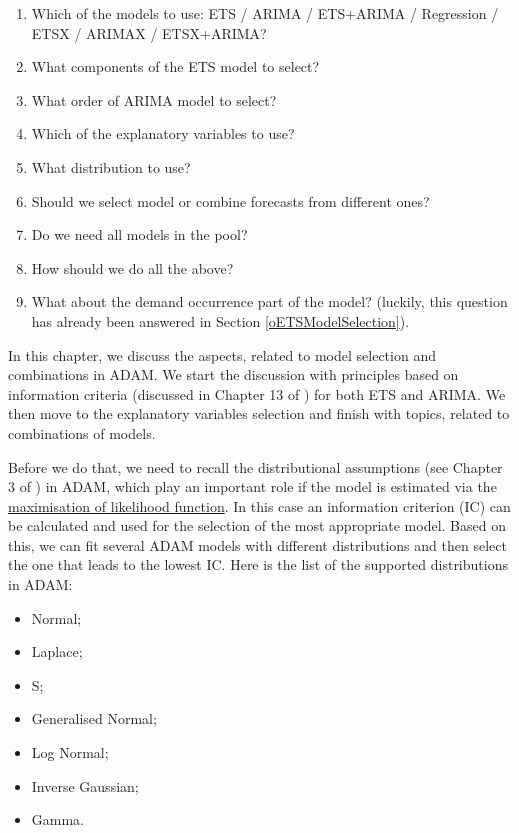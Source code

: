 \documentclass[
]{book}
\providecommand{\tightlist}{%
  \setlength{\itemsep}{0pt}\setlength{\parskip}{0pt}}
\theoremstyle{definition}
\theoremstyle{definition}
\theoremstyle{definition}
\theoremstyle{definition}
\theoremstyle{remark}
\begin{document}
\begin{enumerate}
\def\labelenumi{\arabic{enumi}.}
\tightlist
\item
  Which of the models to use: ETS / ARIMA / ETS+ARIMA / Regression / ETSX / ARIMAX / ETSX+ARIMA?
\item
  What components of the ETS model to select?
\item
  What order of ARIMA model to select?
\item
  Which of the explanatory variables to use?
\item
  What distribution to use?
\item
  Should we select model or combine forecasts from different ones?
\item
  Do we need all models in the pool?
\item
  How should we do all the above?
\item
  What about the demand occurrence part of the model? (luckily, this question has already been answered in Section \ref{oETSModelSelection}).
\end{enumerate}

In this chapter, we discuss the aspects, related to model selection and combinations in ADAM. We start the discussion with principles based on information criteria (discussed in Chapter 13 of \citet{SvetunkovSBA}) for both ETS and ARIMA. We then move to the explanatory variables selection and finish with topics, related to combinations of models.

Before we do that, we need to recall the distributional assumptions (see Chapter 3 of \citet{SvetunkovSBA}) in ADAM, which play an important role if the model is estimated via the \protect\hyperlink{ADAMETSEstimationLikelihood}{maximisation of likelihood function}. In this case an information criterion (IC) can be calculated and used for the selection of the most appropriate model. Based on this, we can fit several ADAM models with different distributions and then select the one that leads to the lowest IC. Here is the list of the supported distributions in ADAM:

\begin{itemize}
\tightlist
\item
  Normal;
\item
  Laplace;
\item
  S;
\item
  Generalised Normal;
\item
  Log Normal;
\item
  Inverse Gaussian;
\item
  Gamma.
\end{itemize}
\end{document}
